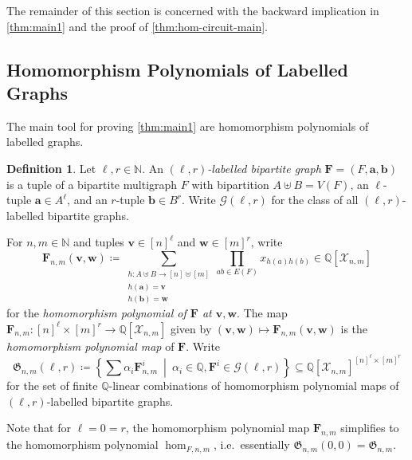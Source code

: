 \documentclass[10pt,a4paper]{article}
\theoremstyle{definition}
\newtheorem{definition}{Definition}[section]
\theoremstyle{plain}
\theoremstyle{remark}
\begin{document}
	The remainder of this section is concerned with the backward implication in \cref{thm:main1} and the proof of \cref{thm:hom-circuit-main}.
	
	
	


	
	\subsection{Homomorphism Polynomials of Labelled Graphs}

	The main tool for proving \cref{thm:main1} are homomorphism polynomials of labelled graphs.
		
	\begin{definition}\label{def:labelled-hom-poly}
		Let $\ell, r \in \mathbb{N}$.
		An \emph{$(\ell, r)$-labelled bipartite graph} $\boldsymbol{F} = (F, \boldsymbol{a}, \boldsymbol{b})$ is a tuple of a bipartite multigraph $F$ with bipartition $A \uplus B = V(F)$,
		an $\ell$-tuple $\boldsymbol{a} \in A^\ell$, and an $r$-tuple $\boldsymbol{b} \in B^r$.
		Write $\mathcal{G}(\ell, r)$ for the class of all $(\ell, r)$-labelled bipartite graphs.
		
		For $n, m \in \mathbb{N}$ and tuples $\boldsymbol{v} \in [n]^\ell$ and $\boldsymbol{w} \in [m]^r$, write
		\[
		\boldsymbol{F}_{n,m}(\boldsymbol{v}, \boldsymbol{w}) \coloneqq \sum_{\substack{h \colon A \uplus B \to [n] \uplus [m]\\ h(\boldsymbol{a}) = \boldsymbol{v} \\ h(\boldsymbol{b}) = \boldsymbol{w}}} \prod_{ab \in E(F)} x_{h(a)h(b)} \in \mathbb{Q}[\mathcal{X}_{n,m}]
		\]
		for the \emph{homomorphism polynomial of $\boldsymbol{F}$ at $\boldsymbol{v},  \boldsymbol{w}$}.
		The map $\boldsymbol{F}_{n,m} \colon [n]^\ell \times [m]^r \to \mathbb{Q}[\mathcal{X}_{n,m}]$ given by $(\boldsymbol{v}, \boldsymbol{w}) \mapsto \boldsymbol{F}_{n,m}(\boldsymbol{v}, \boldsymbol{w})$ is the \emph{homomorphism polynomial map} of $\boldsymbol{F}$. Write
		\[
		\mathfrak{G}_{n,m}(\ell, r) \coloneqq \left\{\sum \alpha_i \boldsymbol{F}^i_{n,m} \ \middle|\  \alpha_i \in \mathbb{Q}, \boldsymbol{F}^i \in \mathcal{G}(\ell, r)\right\} \subseteq \mathbb{Q}[\mathcal{X}_{n,m}]^{[n]^\ell \times [m]^r}
		\]
		for the set of finite $\mathbb{Q}$-linear combinations of homomorphism polynomial maps of $(\ell,r)$-labelled bipartite graphs.
	\end{definition}

	Note that for $\ell = 0 = r$, the homomorphism polynomial map $\boldsymbol{F}_{n,m}$ simplifies to the homomorphism polynomial $\hom_{F, n, m}$, i.e.\ essentially $\mathfrak{G}_{n,m}(0,0) = \mathfrak{G}_{n,m}$. 
	
\end{document}
